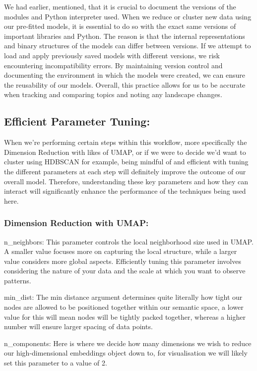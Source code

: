 \documentclass[
  letterpaper,
  DIV=11,
  numbers=noendperiod]{scrreprt}
\begin{document}
We had earlier, mentioned, that it is crucial to document the versions
of the modules and Python interpreter used. When we reduce or cluster
new data using our pre-fitted models, it is essential to do so with the
exact same versions of important libraries and Python. The reason is
that the internal representations and binary structures of the models
can differ between versions. If we attempt to load and apply previously
saved models with different versions, we risk encountering
incompatibility errors. By maintaining version control and documenting
the environment in which the models were created, we can ensure the
reusability of our models. Overall, this practice allows for us to be
accurate when tracking and comparing topics and noting any landscape
changes.

\subsection{Efficient Parameter
Tuning:}\label{efficient-parameter-tuning}

When we're performing certain steps within this workflow, more
specifically the Dimension Reduction with likes of UMAP, or if we were
to decide we'd want to cluster using HDBSCAN for example, being mindful
of and efficient with tuning the different parameters at each step will
definitely improve the outcome of our overall model. Therefore,
understanding these key parameters and how they can interact will
significantly enhance the performance of the techniques being used here.

\subsubsection{Dimension Reduction with
UMAP:}\label{dimension-reduction-with-umap}

n\_neighbors: This parameter controls the local neighborhood size used
in UMAP. A smaller value focuses more on capturing the local structure,
while a larger value considers more global aspects. Efficiently tuning
this parameter involves considering the nature of your data and the
scale at which you want to observe patterns.

min\_dist: The min distance argument determines quite literally how
tight our nodes are allowed to be positioned together within our
semantic space, a lower value for this will mean nodes will be tightly
packed together, whereas a higher number will ensure larger spacing of
data points.

n\_components: Here is where we decide how many dimensions we wish to
reduce our high-dimensional embeddings object down to, for visualisation
we will likely set this parameter to a value of 2.
\end{document}
